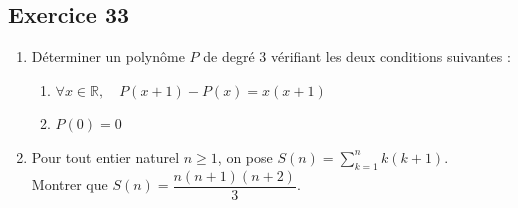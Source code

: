 \documentclass[11pt,a4paper]{article}
\begin{document}
\subsection*{Exercice 33}
\begin{enumerate}
    \item Déterminer un polynôme $P$ de degré 3 vérifiant les deux conditions suivantes :
    \begin{enumerate}[label=(\alph*)]
        \item $\forall x \in \mathbb{R}, \quad P(x+1) - P(x) = x(x+1)$
        \item $P(0) = 0$
    \end{enumerate}
    \item Pour tout entier naturel $n \ge 1$, on pose $S(n) = \displaystyle\sum_{k=1}^n k(k+1)$.\\
    Montrer que $S(n) = \dfrac{n(n+1)(n+2)}{3}$.
\end{enumerate}
\end{document}
